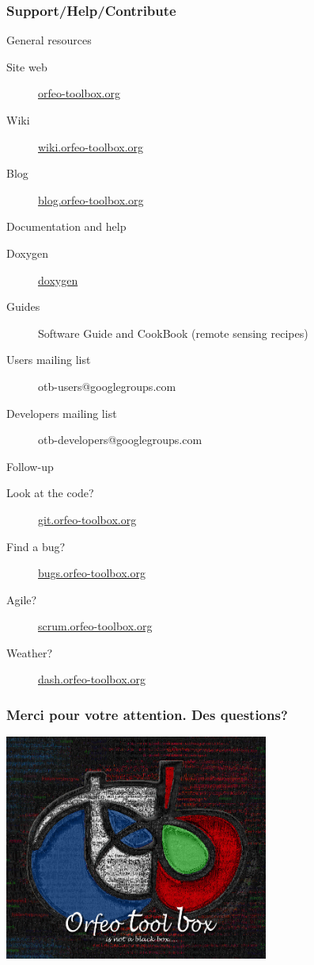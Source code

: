 \documentclass[8pt]{beamer}
\begin{document}
\begin{frame}
\frametitle{Support/Help/Contribute}
\vspace{-0.2cm}
\begin{block}{General resources}
\vspace{-0.2cm}
\begin{description}
\item[Site web] \href{http://www.orfeo-toolbox.org}{orfeo-toolbox.org}
\item[Wiki] \href{http://wiki.orfeo-toolbox.org}{wiki.orfeo-toolbox.org}
\item[Blog] \href{http://blog.orfeo-toolbox.org}{blog.orfeo-toolbox.org}
\end{description}
\end{block}
\vspace{-0.2cm}
\begin{block}{Documentation and help}
\vspace{-0.2cm}
\begin{description}
\item[Doxygen] \href{http://www.orfeo-toolbox.org/doxygen/}{doxygen}
\item[Guides] Software Guide and CookBook (remote sensing recipes)
\item[Users mailing list] otb-users@googlegroups.com
\item[Developers mailing list] otb-developers@googlegroups.com
\end{description}
\end{block}
\vspace{-0.2cm}
\begin{block}{Follow-up}
\vspace{-0.2cm}
\begin{description}
\item[Look at the code?] \href{http://git.orfeo-toolbox.org}{git.orfeo-toolbox.org}
\item[Find a bug?] \href{http://bugs.orfeo-toolbox.org}{bugs.orfeo-toolbox.org}
\item[Agile?] \href{http://scrum.orfeo-toolbox.org}{scrum.orfeo-toolbox.org}
\item[Weather?] \href{http://dash.orfeo-toolbox.org}{dash.orfeo-toolbox.org}
\end{description}
\end{block}
\end{frame}

\begin{frame}
\frametitle{Merci pour votre attention. Des questions?}
\begin{minipage}[t][6cm][t]{\textwidth}
\begin{center}
\includegraphics[width=0.65\textwidth]{images/LOGOTB_blackbox.png}
\end{center}
\end{minipage}
\end{frame}
\end{document}
